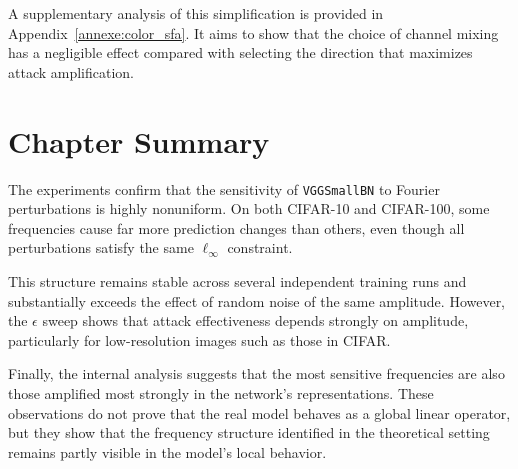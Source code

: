 A supplementary analysis of this simplification is provided in Appendix~\ref{annexe:color_sfa}.
It aims to show that the choice of channel mixing has a negligible effect compared with selecting the direction that maximizes attack amplification.

\section{Chapter Summary}
\label{sec:synthese_chapitre4}

The experiments confirm that the sensitivity of \texttt{VGGSmallBN} to Fourier
perturbations is highly nonuniform. On both CIFAR-10 and CIFAR-100, some frequencies
cause far more prediction changes than others, even though all perturbations
satisfy the same $\ell_\infty$ constraint.

This structure remains stable across several independent training runs and substantially exceeds the effect
of random noise of the same amplitude. However, the $\epsilon$ sweep shows that
attack effectiveness depends strongly on amplitude, particularly for low-resolution
images such as those in CIFAR.

Finally, the internal analysis suggests that the most sensitive frequencies are also those amplified
most strongly in the network's representations. These observations do not prove that the real model
behaves as a global linear operator, but they show that the frequency structure
identified in the theoretical setting remains partly visible in the model's local behavior.
